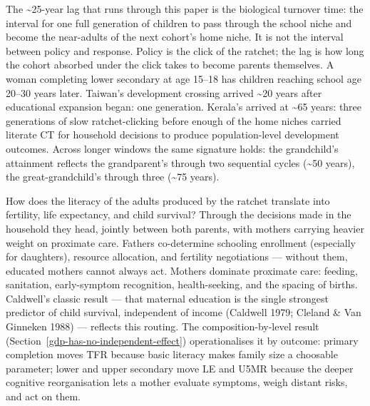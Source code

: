 \documentclass[12pt,letterpaper]{article}
\begin{document}
The \textasciitilde 25-year lag that runs through this paper is the
biological turnover time: the interval for one full generation of
children to pass through the school niche and become the near-adults
of the next cohort's home niche. It is not the interval between
policy and response. Policy is the click of the ratchet; the lag is
how long the cohort absorbed under the click takes to become parents
themselves. A woman completing lower secondary at age 15--18 has
children reaching school age 20--30 years later. Taiwan's development
crossing arrived \textasciitilde 20 years after educational expansion
began: one generation. Kerala's arrived at \textasciitilde 65 years:
three generations of slow ratchet-clicking before enough of the home
niches carried literate CT for household decisions to produce
population-level development outcomes. Across longer windows the same
signature holds: the grandchild's attainment reflects the
grandparent's through two sequential cycles
(\textasciitilde 50 years), the great-grandchild's through three
(\textasciitilde 75 years).

How does the literacy of the adults produced by the ratchet translate
into fertility, life expectancy, and child survival? Through the
decisions made in the household they head, jointly between both
parents, with mothers carrying heavier weight on proximate care.
Fathers co-determine schooling enrollment (especially for daughters),
resource allocation, and fertility negotiations --- without them,
educated mothers cannot always act. Mothers dominate proximate care:
feeding, sanitation, early-symptom recognition, health-seeking, and
the spacing of births. Caldwell's classic result --- that maternal
education is the single strongest predictor of child survival,
independent of income (Caldwell 1979; Cleland \& Van Ginneken 1988) ---
reflects this routing. The composition-by-level result
(Section~\ref{gdp-has-no-independent-effect}) operationalises it by
outcome: primary completion moves TFR because basic literacy makes
family size a choosable parameter; lower and upper secondary move LE
and U5MR because the deeper cognitive reorganisation lets a mother
evaluate symptoms, weigh distant risks, and act on them.
\end{document}
